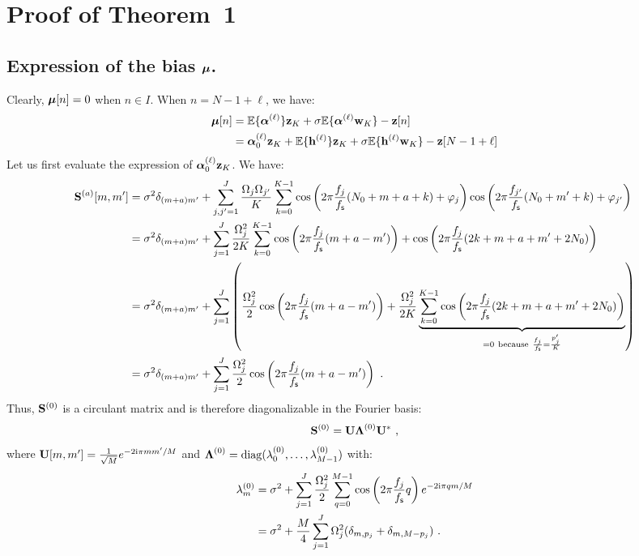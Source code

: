 \documentclass[journal,onecolumn]{IEEEtran}
\begin{document}
\section{Proof of Theorem~1}
\label{ap:th.error}

\subsection{Expression of the bias $\boldsymbol{\mu}$.}
Clearly, $\boldsymbol{\mu}[n]=0$ when $n\in I$. When $n=N-1+\ell$, we have:
\begin{align*}
\boldsymbol{\mu}[n] &=  {\mathbb E}\{\boldsymbol{\alpha}^{(\ell)}\}{\mathbf z}_{K} + \sigma{\mathbb E}\{\boldsymbol{\alpha}^{(\ell)}{\mathbf w}_{K}\} - {\mathbf z}[n]\\
& = \boldsymbol{\alpha}_0^{(\ell)}{\mathbf z}_{K} + {\mathbb E}\{{\mathbf h}^{(\ell)}\}{\mathbf z}_{K} + \sigma{\mathbb E}\{{\mathbf h}^{(\ell)}{\mathbf w}_{K}\} - {\mathbf z}[N-1+\ell]
\end{align*}
Let us first evaluate the expression of $\boldsymbol{\alpha}_0^{(\ell)}{\mathbf z}_K$. We have:
\begin{align*}
\bS^{(a)}[m,m'] &= \sigma^2\delta_{(m+a)m'}+\sum_{j,j'=1}^J\dfrac{\Omega_j\Omega_{j'}}{K}\sum_{k=0}^{K-1} \cos\left(2\pi \frac{f_j}{\fs}(N_0+m+a+k)+\varphi_j\right)\cos\left(2\pi \frac{f_{j'}}{\fs}(N_0+m'+k)+\varphi_{j'}\right) \\
&= \sigma^2\delta_{(m+a)m'}+\sum_{j=1}^J\dfrac{\Omega_j^2}{2K}\sum_{k=0}^{K-1} \cos\left(2\pi \frac{f_j}{\fs}(m+a-m')\right) + \cos\left(2\pi \frac{f_j}{\fs}(2k+m+a+m'+2N_0)\right)\\
&= \sigma^2\delta_{(m+a)m'}+\sum_{j=1}^J\left( \dfrac{\Omega_j^2}2\cos\left(2\pi \frac{f_j}{\fs}(m+a-m')\right) + \dfrac{\Omega_j^2}{2K}\underbrace{\sum_{k=0}^{K-1}\cos\left(2\pi \frac{f_j}{\fs}(2k+m+a+m'+2N_0)\right)}_{=0\ \mathrm{because}\ \frac{f_j}\fs=\frac{p'_j}K } \right)\\
&= \sigma^2\delta_{(m+a)m'}+\sum_{j=1}^J\dfrac{\Omega_j^2}2\cos\left(2\pi \frac{f_j}{\fs}(m+a-m')\right)\ .
\end{align*}
Thus, ${\mathbf S}^{(0)}$ is a circulant matrix and is therefore diagonalizable in the Fourier basis:
\[
{\mathbf S}^{(0)} = {\mathbf U}\boldsymbol{\Lambda}^{(0)}{\mathbf U}^*\ ,
\]
where ${\mathbf U}[m,m']=\frac1{\sqrt{M}}e^{-2\mathrm{i}\pi mm'/M}$ and $\boldsymbol{\Lambda}^{(0)} = \mathrm{diag}(\lambda_0^{(0)},\dots,\lambda_{M-1}^{(0)})$ with:
\begin{align*}
\lambda_m^{(0)} &= \sigma^2 + \sum_{j=1}^J\dfrac{\Omega_j^2}2\sum_{q=0}^{M-1} \cos\left(2\pi\frac{f_j}{f_{\mathsf s}} q\right) e^{-2\mathrm{i}\pi qm/M} \\
&= \sigma^2 + \dfrac{M}{4}\sum_{j=1}^J\Omega_j^2(\delta_{m,p_j} + \delta_{m,M-p_j})\ .
\end{align*}
\end{document}
